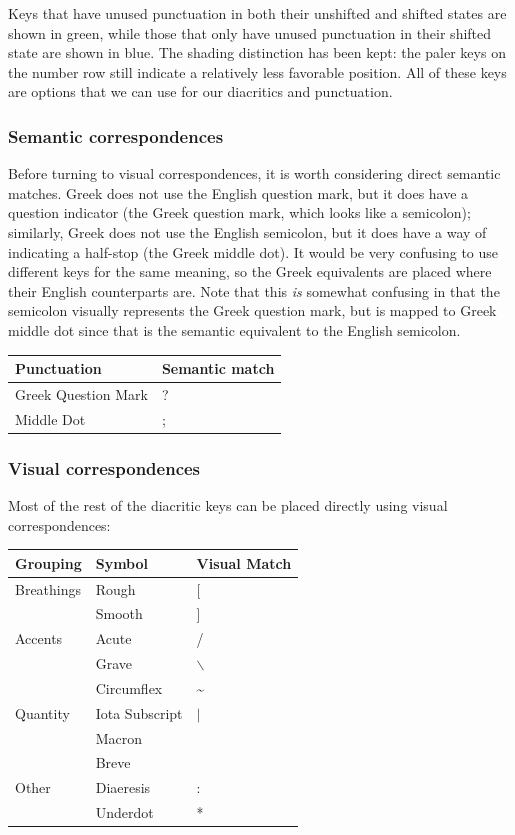 \documentclass[11pt]{article}
\begin{document}
Keys that have unused punctuation in both their unshifted and shifted states are shown in green, while those that only have unused punctuation in their shifted state are shown in blue. The shading distinction has been kept: the paler keys on the number row still indicate a relatively less favorable position. All of these keys are options that we can use for our diacritics and punctuation.

\subsubsection{Semantic correspondences}
\label{sec:orgc74177e}

Before turning to visual correspondences, it is worth considering direct semantic matches. Greek does not use the English question mark, but it does have a question indicator (the Greek question mark, which looks like a semicolon); similarly, Greek does not use the English semicolon, but it does have a way of indicating a half-stop (the Greek middle dot). It would be very confusing to use different keys for the same meaning, so the Greek equivalents are placed where their English counterparts are. Note that this \emph{is} somewhat confusing in that the semicolon visually represents the Greek question mark, but is mapped to Greek middle dot since that is the semantic equivalent to the English semicolon.

\begin{center}
\begin{tabular}{ll}
Punctuation & Semantic match\\
\hline
Greek Question Mark & ?\\
Middle Dot & ;\\
\end{tabular}
\end{center}

\subsubsection{Visual correspondences}
\label{sec:orgbf5ccb1}

Most of the rest of the diacritic keys can be placed directly using visual correspondences:

\begin{center}
\begin{tabular}{lll}
Grouping & Symbol & Visual Match\\
\hline
Breathings & Rough & [\\
 & Smooth & ]\\
Accents & Acute & /\\
 & Grave & $\backslash$\\
 & Circumflex & \textasciitilde{}\\
Quantity & Iota Subscript & \(\vert{}\)\\
 & Macron & \\
 & Breve & \\
Other & Diaeresis & :\\
 & Underdot & *\\
\end{tabular}
\end{center}
\end{document}
